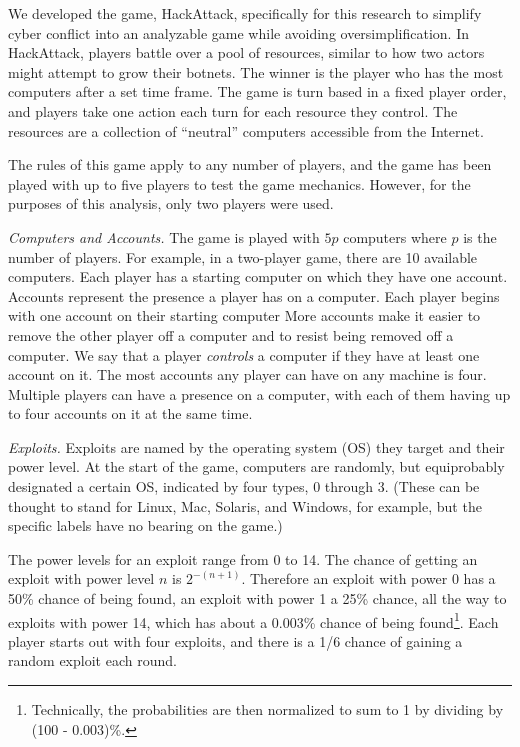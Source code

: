 We developed the game, HackAttack, specifically for this research to simplify cyber conflict into an analyzable game while avoiding oversimplification. 
In HackAttack, players battle over a pool of resources, similar to how two actors might attempt to grow their botnets. 
The winner is the player who has the most computers after a set time frame. 
The game is turn based in a fixed player order, and players take one action each turn for each resource they control. The resources are a collection of ``neutral'' computers accessible from the Internet. 

The rules of this game apply to any number of players, and the game has been played with up to five players to test the game mechanics. However, for the purposes of this analysis, only two players were used. 

{\em Computers and Accounts.}
The game is played with $5p$ computers where $p$ is the number of players.
For example, in a two-player game, there are 10 available computers.
Each player has a starting computer on which they have one account.
Accounts represent the presence a player has on a computer. Each player begins with one account on their starting computer
More accounts make it easier to remove the other player off a computer and to resist being removed off a computer.
We say that a player {\em controls} a computer if they have at least one account on it.
The most accounts any player can have on any machine is four. 
Multiple players can have a presence on a computer, with each of them having up to four accounts on it at the same time. 

{\em Exploits.}
Exploits are named by the operating system (OS) they target and their power level.  At the start of the game, computers are randomly, but equiprobably designated a certain OS, indicated by four types, 0 through 3. (These can be thought to stand for Linux, Mac, Solaris, and Windows, for example, but the specific labels have no bearing on the game.) 

The power levels for an exploit range from 0 to 14. The chance of getting an exploit with power level $n$ is $2^{-(n+1)}$. Therefore an exploit with power 0 has a 50\% chance of being found, an exploit with power 1 a 25\% chance, all the way to exploits with power 14, which has about a 0.003\% chance of being found\footnote{Technically, the probabilities are then normalized to sum to 1 by dividing by (100 - 0.003)\%.}. Each player starts out with four exploits, and there is a 1/6 chance of gaining a random exploit each round. 

